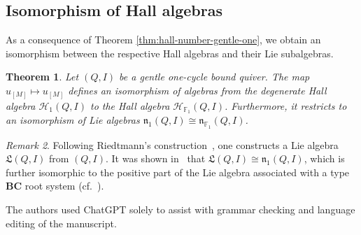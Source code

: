 \documentclass[12pt]{amsart}
\newtheorem{theorem}{Theorem}[section]
\theoremstyle{remark}
\newtheorem{remark}[theorem]{Remark}
\theoremstyle{definition}
\numberwithin{equation}{section}
\begin{document}
\subsection{Isomorphism of Hall algebras}
As a consequence of Theorem \ref{thm:hall-number-gentle-one}, we obtain an isomorphism between the respective Hall algebras and their Lie subalgebras.
\begin{theorem}\label{thme:isom-hall-alg-gentle-one-cylce}
    Let $(Q,I)$ be a gentle one-cycle bound quiver. The map $u_{[M]}\mapsto u_{[M]}$ defines an isomorphism of algebras from the degenerate Hall algebra $\mathcal{H}_1(Q,I)$ to the Hall algebra $\mathcal{H}_{\mathbb{F}_1}(Q,I)$. Furthermore, it restricts to an isomorphism of Lie algebras $\mathfrak{n}_1(Q,I)\cong \mathfrak{n}_{\mathbb{F}_1}(Q,I)$.
\end{theorem}
\begin{remark}
    Following Riedtmann’s construction~\cite{Rie94}, one constructs a Lie algebra $\mathfrak{L}(Q,I)$ from $(Q,I)$. It was shown in~\cite{CY24} that $\mathfrak{L}(Q,I) \cong \mathfrak{n}_1(Q,I)$, which is further isomorphic to the positive part of the Lie algebra associated with a type $\mathbf{BC}$ root system (cf.~\cite{CY22}).
\end{remark}


The authors used ChatGPT solely to assist with grammar checking and language editing of the manuscript. 




\end{document}

